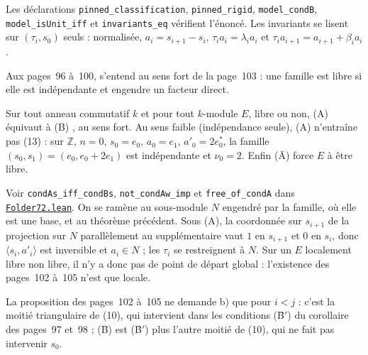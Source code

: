\noindent Les déclarations \texttt{pinned\_classification}, \texttt{pinned\_rigid}, \texttt{model\_condB}, \texttt{model\_isUnit\_iff} et \texttt{invariants\_eq} vérifient l'énoncé. Les invariants se lisent sur $(\tau_i, s_0)$ seuls : normalisée, $a_i = s_{i+1} - s_i$, $\tau_i a_i = \lambda_i a_i$ et $\tau_i a_{i+1} = a_{i+1} + \beta_i a_i$.

Aux pages~96 à~100,  s'entend au sens fort de la page~103 : une famille est libre si elle est indépendante et engendre un facteur direct.

\begin{encadre}
\begin{theoreme}
Sur tout anneau commutatif $k$ et pour tout $k$-module $E$, libre ou non, (A)  équivaut à (B) ,  au sens fort. Au sens faible (indépendance seule), (A) n'entraîne pas (13) : sur $\mathbb Z$, $n = 0$, $s_0 = e_0$, $a_0 = e_1$, $a'_0 = 2e_0^*$, la famille $(s_0, s_1) = (e_0, e_0 + 2e_1)$ est indépendante et $\nu_0 = 2$. Enfin (Ā) force $E$ à être libre.
\end{theoreme}
\end{encadre}

\begingroup\raggedright
\noindent Voir \texttt{condAs\_iff\_condBs}, \texttt{not\_condAw\_imp} et \texttt{free\_of\_condA} dans \href{\leanblob/Geometry/Folder72.lean}{\texttt{Folder72.\allowbreak{}lean}}. On se ramène au sous-module $N$ engendré par la famille, où elle est une base, et au théorème précédent. Sous (A), la coordonnée sur $s_{i+1}$ de la projection sur $N$ parallèlement au supplémentaire vaut $1$ en $s_{i+1}$ et $0$ en $s_i$, donc $\langle s_i, a'_i\rangle$ est inversible et $a_i \in N$ ; les $\tau_i$ se restreignent à $N$. Sur un $E$ localement libre non libre, il n'y a donc pas de point de départ global : l'existence des pages~102 à~105 n'est que locale.\par\endgroup

La proposition des pages~102 à~105 ne demande b) que pour $i < j$ : c'est la moitié triangulaire de (10), qui intervient dans les conditions (B̄$'$) du corollaire des pages~97 et~98 ; (B̄) est (B̄$'$) plus l'autre moitié de (10), qui ne fait pas intervenir $s_0$.

